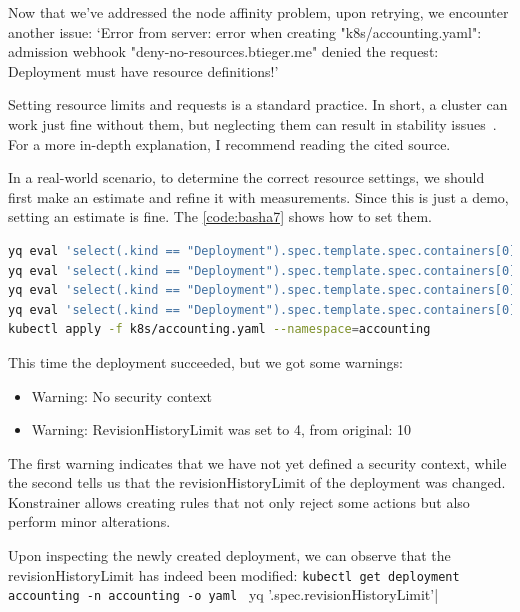 Now that we've addressed the node affinity problem, upon retrying, we encounter another issue: `Error from server: error when creating "k8s/accounting.yaml": admission webhook "deny-no-resources.btieger.me" denied the request: Deployment must have resource definitions!'

Setting resource limits and requests is a standard practice. In short, a cluster can work just fine without them, but neglecting them can result in stability issues~\cite{ResourcesGood}. For a more in-depth explanation, I recommend reading the cited source.

In a real-world scenario, to determine the correct resource settings, we should first make an estimate and refine it with measurements. Since this is just a demo, setting an estimate is fine. The \ref{code:basha7} shows how to set them.

\begin{lstlisting}[caption={Setting resources and redeploy the Accounting module},language=bash,label=code:basha7]
yq eval 'select(.kind == "Deployment").spec.template.spec.containers[0].resources.limits.cpu = "500m"' k8s/accounting.yaml -i
yq eval 'select(.kind == "Deployment").spec.template.spec.containers[0].resources.limits.memory = "128Mi"' k8s/accounting.yaml -i
yq eval 'select(.kind == "Deployment").spec.template.spec.containers[0].resources.requests.cpu = "500m"' k8s/accounting.yaml -i
yq eval 'select(.kind == "Deployment").spec.template.spec.containers[0].resources.requests.memory = "128Mi"' k8s/accounting.yaml -i
kubectl apply -f k8s/accounting.yaml --namespace=accounting
\end{lstlisting}

This time the deployment succeeded, but we got some warnings:

\begin{itemize}
  \item Warning: No security context
  \item Warning: RevisionHistoryLimit was set to 4, from original: 10
\end{itemize}

The first warning indicates that we have not yet defined a security context, while the second tells us that the revisionHistoryLimit of the deployment was changed. Konstrainer allows creating rules that not only reject some actions but also perform minor alterations.

Upon inspecting the newly created deployment, we can observe that the revisionHistoryLimit has indeed been modified:
\lstinline|kubectl get deployment accounting -n accounting -o yaml | yq '.spec.revisionHistoryLimit'|

